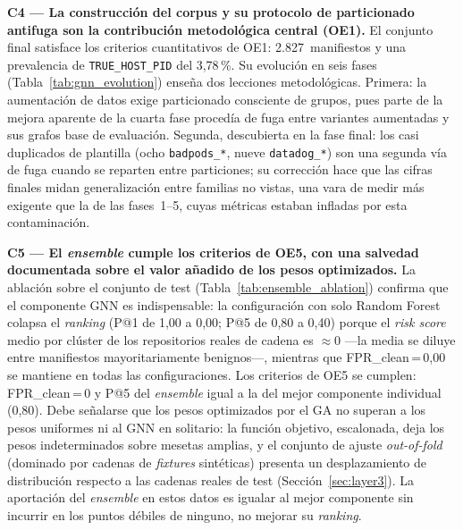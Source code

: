 \textbf{C4 — La construcción del corpus y su protocolo de particionado
antifuga son la contribución metodológica central (OE1).} El conjunto final
satisface los criterios cuantitativos de OE1: 2.827~manifiestos y una prevalencia
de \texttt{TRUE\_HOST\_PID} del 3,78\,\%. Su evolución en seis fases
(Tabla~\ref{tab:gnn_evolution}) enseña dos lecciones metodológicas. Primera: la
aumentación de datos exige particionado consciente de grupos, pues parte de la
mejora aparente de la cuarta fase procedía de fuga entre variantes aumentadas y sus
grafos base de evaluación. Segunda, descubierta en la fase final: los casi
duplicados de plantilla (ocho \texttt{badpods\_*}, nueve \texttt{datadog\_*}) son
una segunda vía de fuga cuando se reparten entre particiones; su corrección hace
que las cifras finales midan generalización entre familias no vistas, una vara de
medir más exigente que la de las fases~1--5, cuyas métricas estaban infladas por
esta contaminación.

\textbf{C5 — El \textit{ensemble} cumple los criterios de OE5, con una salvedad
documentada sobre el valor añadido de los pesos optimizados.} La ablación sobre
el conjunto de test (Tabla~\ref{tab:ensemble_ablation}) confirma que el
componente \ac{GNN} es indispensable: la configuración con solo Random Forest colapsa el
\textit{ranking} (P@1 de 1,00 a 0,00; P@5 de 0,80 a 0,40) porque el \textit{risk score}
medio por clúster de los repositorios reales de cadena es \(\approx\)0 —la media
se diluye entre manifiestos mayoritariamente benignos\mbox{—,}
mientras que \ac{FPR}\_clean\,=\,0,00 se mantiene en todas las configuraciones.
Los criterios de OE5 se cumplen: \ac{FPR}\_clean\,=\,0 y P@5 del \textit{ensemble} igual
a la del mejor componente individual (0,80). Debe señalarse que los pesos
optimizados por el \ac{GA} no superan a los pesos uniformes ni al \ac{GNN} en
solitario: la función objetivo, escalonada, deja los pesos indeterminados sobre
mesetas amplias, y el conjunto de ajuste \textit{out-of-fold} (dominado por
cadenas de \textit{fixtures} sintéticas) presenta un desplazamiento de
distribución respecto a las cadenas reales de test
(Sección~\ref{sec:layer3}). La aportación del \textit{ensemble} en estos datos
es igualar al mejor componente sin incurrir en los puntos débiles de ninguno,
no mejorar su \textit{ranking}.

